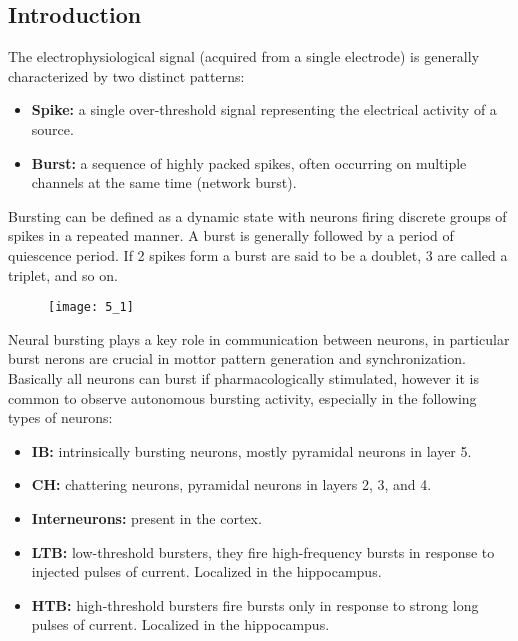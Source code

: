\subsection{Introduction}
The electrophysiological signal (acquired from a single electrode) is generally
characterized by two distinct patterns:
\begin{itemize}
    \item \textbf{Spike:} a single over-threshold signal representing the
          electrical activity of a source.
    \item \textbf{Burst:} a sequence of highly packed spikes, often occurring on
          multiple channels at the same time (network burst).
\end{itemize}
Bursting can be defined as a dynamic state with neurons firing discrete groups of
spikes in a repeated manner. A burst is generally followed by a period of quiescence
period. If 2 spikes form a burst are said to be a doublet, 3 are called a triplet,
and so on.
\begin{figure}[H]
    \texttt{[image: 5\_1]}
    \centering
\end{figure}
Neural bursting plays a key role in communication between neurons, in particular
burst nerons are crucial in mottor pattern generation and synchronization.
Basically all neurons can burst if pharmacologically stimulated, however
it is common to observe autonomous bursting activity, especially in the following
types of neurons:
\begin{itemize}
    \item \textbf{IB:} intrinsically bursting neurons, mostly pyramidal neurons in
          layer 5.
    \item \textbf{CH:} chattering neurons, pyramidal neurons in layers 2, 3, and 4.
    \item \textbf{Interneurons:} present in the cortex.
    \item \textbf{LTB:} low-threshold bursters, they fire high-frequency bursts in
          response to injected pulses of current. Localized in the hippocampus.
    \item \textbf{HTB:} high-threshold bursters fire bursts only in response to
          strong long pulses of current. Localized in the hippocampus.
\end{itemize}
